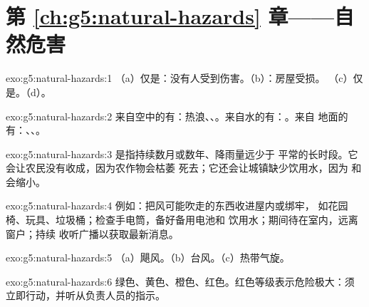 \section*{第 \ref{ch:g5:natural-hazards} 章——自然危害}

\begin{solution}{exo:g5:natural-hazards:1}
（a）仅是：没有人受到伤害。（b）：房屋受损。
（c）仅是。（d）。
\end{solution}

\begin{solution}{exo:g5:natural-hazards:2}
来自空中的有：热浪、、。来自水的有：。来自
地面的有：、、。
\end{solution}

\begin{solution}{exo:g5:natural-hazards:3}
是指持续数月或数年、降雨量远少于
平常的长时段。它会让农民没有收成，因为农作物会枯萎
死去；它还会让城镇缺少饮用水，因为
和会缩小。
\end{solution}

\begin{solution}{exo:g5:natural-hazards:4}
例如：把风可能吹走的东西收进屋内或绑牢，
如花园椅、玩具、垃圾桶；检查手电筒，备好备用电池和
饮用水；期间待在室内，远离窗户；持续
收听广播以获取最新消息。
\end{solution}

\begin{solution}{exo:g5:natural-hazards:5}
（a）飓风。（b）台风。（c）热带气旋。
\end{solution}

\begin{solution}{exo:g5:natural-hazards:6}
绿色、黄色、橙色、红色。红色等级表示危险极大：须
立即行动，并听从负责人员的指示。
\end{solution}

